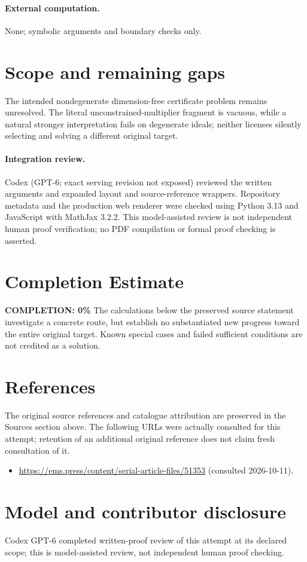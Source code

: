 \documentclass[11pt]{article}
\begin{document}
\paragraph{External computation.} None; symbolic arguments and boundary checks only.
\section{Scope and remaining gaps}
The intended nondegenerate dimension-free certificate problem remains unresolved. The literal unconstrained-multiplier fragment is vacuous, while a natural stronger interpretation fails on degenerate ideals; neither licenses silently selecting and solving a different original target.
\paragraph{Integration review.} Codex (GPT-6; exact serving revision not exposed) reviewed the written arguments and expanded layout and source-reference wrappers. Repository metadata and the production web renderer were checked using Python 3.13 and JavaScript with MathJax 3.2.2. This model-assisted review is not independent human proof verification; no PDF compilation or formal proof checking is asserted.

\section{Completion Estimate}
\noindent\textbf{COMPLETION: 0\%}
The calculations below the preserved source statement investigate a concrete route,
but establish no substantiated new progress toward the entire original target.
Known special cases and failed sufficient conditions are not credited as a solution.
\section{References}
The original source references and catalogue attribution are preserved in the
Sources section above. The following URLs were actually consulted for this attempt;
retention of an additional original reference does not claim fresh consultation of it.
\begin{itemize}
\item \url{https://ems.press/content/serial-article-files/51353} (consulted 2026-10-11). 
\end{itemize}
\section{Model and contributor disclosure}
Codex GPT-6 completed written-proof review of this attempt at its declared scope; this is model-assisted review, not independent human proof checking.
\end{document}
